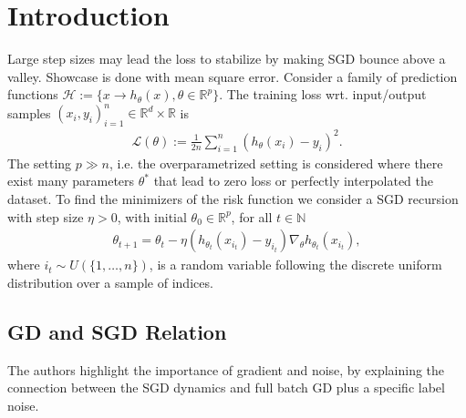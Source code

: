 




\maketitle

\tableofcontents

\section{Introduction}
Large step sizes may lead the loss to stabilize by making SGD bounce above a
valley. Showcase is done with mean square error. Consider a family of
prediction functions $\mathcal{H} := \{x \to h_\theta(x), \theta \in
\mathbb{R}^{p}\}$. The training loss wrt. input/output samples $(x_i,
y_i)_{i=1}^{n} \in \mathbb{R}^{d}\times\mathbb{R}$ is
\begin{align}
    \mathcal{L}(\theta) := \frac{1}{2n} \sum_{i=1}^{n} \left( h_\theta(x_i) -
    y_i \right)^{2}.
\end{align}
The setting $p \gg n$, i.e. the overparametrized setting is considered where
there exist many parameters $\theta^{*}$ that lead to zero loss or perfectly
interpolated the dataset. To find the minimizers of the risk function we
consider a SGD recursion with step size $\eta > 0$, with initial $\theta_0
\in \mathbb{R}^{p}$, for all $t \in \mathbb{N}$
\begin{align}
    \theta_{t+1} = \theta_t - \eta\left(h_{\theta_t}(x_{i_t})
    - y_{i_t}\right)
    \nabla_{\theta} h_{\theta_t}(x_{i_t}), \label{eq: sgd_it}
\end{align}
where $i_t \sim U(\{1,\ldots,n\})$, is a random variable following the
discrete uniform distribution over a sample of indices.
\subsection{GD and SGD Relation}
The authors highlight the importance of gradient and noise, by explaining the
connection between the SGD dynamics and full batch GD plus a specific label
noise.

